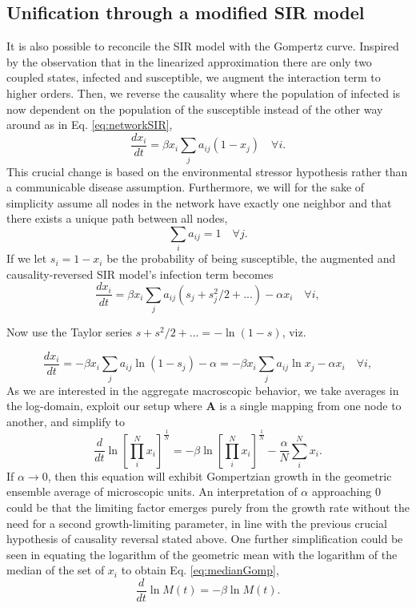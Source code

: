 \documentclass{article}
\begin{document}
\subsection*{Unification through a modified SIR model}
It is also possible to reconcile the SIR model with the Gompertz curve. 
Inspired by the observation that in the linearized approximation there are only two coupled states, infected and susceptible, we augment the interaction term to higher orders. 
Then, we reverse the causality where the population of infected is now dependent on the population of the susceptible instead of the other way around as in Eq. \ref{eq:networkSIR},
\begin{equation}
\label{eq:reverseNetworkSIR}
\frac{d x_i}{dt} = \beta x_i\sum_j{a_{ij}}(1-x_j) \quad \forall i.
\end{equation} 
This crucial change is based on the environmental stressor hypothesis rather than a communicable disease assumption.
Furthermore, we will for the sake of simplicity assume all nodes in the network have exactly one neighbor and that there exists a unique path between all nodes,
\begin{equation}
\sum_i a_{ij} = 1 \quad \forall j.
\end{equation} 
If we let $s_i = 1 - x_i$ be the probability of being susceptible, the augmented and causality-reversed SIR model's infection term becomes 
\begin{equation}
\frac{d x_i}{dt} = \beta x_i\sum_j{a_{ij}}(s_{j} + s^2_j/2 + ...) - \alpha x_i\quad \forall i,
\end{equation}

Now use the Taylor series $s+s^2/2+... = -\ln(1-s)$, viz.

\begin{equation}
\frac{d x_i}{dt} = -\beta x_i\sum_j{a_{ij}}\ln{(1 - s_j)} - \alpha = -\beta x_i\sum_j{a_{ij}}\ln{x_j} - \alpha x_i \quad \forall i,
\end{equation}
As we are interested in the aggregate macroscopic behavior, we take averages in the log-domain, exploit our setup where $\mathbf{A}$ is a single mapping from one node to another, and simplify to
\begin{equation}
\frac{d}{{dt}} \ln\left[\prod_i^N{x_i}\right]^{\frac{1}{N}} = -\beta\ln\left[\prod_i^N{x_i}\right]^{\frac{1}{N}} - \frac{\alpha}{N}\sum_i^N x_i.
\end{equation}
If $\alpha\rightarrow 0$, then this equation will exhibit Gompertzian growth in the geometric ensemble average of microscopic units. 
An interpretation of $\alpha$ approaching $0$ could be that the limiting factor emerges purely from the growth rate without the need for a second growth-limiting parameter, in line with the previous crucial hypothesis of causality reversal stated above. One further simplification could be seen in equating the logarithm of the geometric mean with the logarithm of the median of the set of $x_i$ to obtain Eq. \ref{eq:medianGomp},
\begin{equation}
\frac{d}{dt}\ln{M(t)} = -\beta \ln{M(t)}.
\end{equation}
\end{document}

